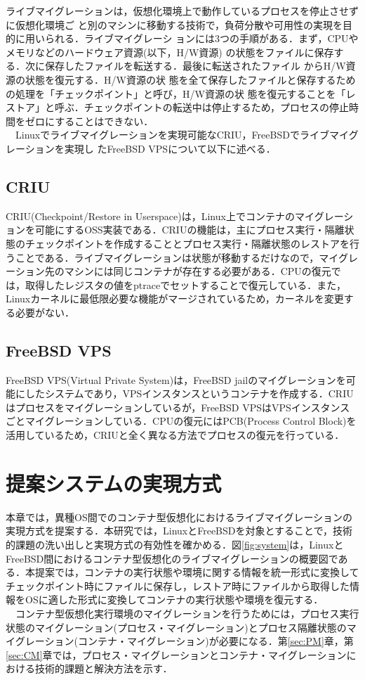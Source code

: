 \documentclass[11pt]{jarticle}
\begin{document}
ライブマイグレーションは，仮想化環境上で動作しているプロセスを停止させずに仮想化環境ご
と別のマシンに移動する技術で，負荷分散や可用性の実現を目的に用いられる．ライブマイグレーシ
ョンには3つの手順がある．まず，CPUやメモリなどのハードウェア資源(以下，H/W資源)
の状態をファイルに保存する．次に保存したファイルを転送する．最後に転送されたファイル
からH/W資源の状態を復元する．H/W資源の状
態を全て保存したファイルと保存するための処理を「チェックポイント」と呼び，H/W資源の状
態を復元することを「レストア」と呼ぶ．チェックポイントの転送中は停止するため，プロセスの停止時間をゼロにすることはできない．\\
　Linuxでライブマイグレーションを実現可能なCRIU，FreeBSDでライブマイグレーションを実現し
たFreeBSD VPSについて以下に述べる．

\subsection{CRIU}
\label{sec:CRIU}
CRIU(Checkpoint/Restore in Userspace)は，Linux上でコンテナのマイグレーションを可能にするOSS実装である．CRIUの機能は，主にプロセス実行・隔離状態のチェックポイントを作成することとプロセス実行・隔離状態のレストアを行うことである．ライブマイグレーションは状態が移動するだけなので，マイグレーション先のマシンには同じコンテナが存在する必要がある．CPUの復元では，取得したレジスタの値をptraceでセットすることで復元している．また，Linuxカーネルに最低限必要な機能がマージされているため，カーネルを変更する必要がない．

\subsection{FreeBSD VPS}
\label{sec:FreeBSD VPS}
FreeBSD VPS(Virtual Private System)は，FreeBSD jailのマイグレーションを可能にしたシステムであり，VPSインスタンスというコンテナを作成する．CRIUはプロセスをマイグレーションしているが，FreeBSD VPSはVPSインスタンスごとマイグレーションしている．CPUの復元にはPCB(Process Control Block)を活用しているため，CRIUと全く異なる方法でプロセスの復元を行っている．

\section{提案システムの実現方式}
\label{sec:suggest}
本章では，異種OS間でのコンテナ型仮想化におけるライブマイグレーションの実現方式を提案する．本研究では，LinuxとFreeBSDを対象とすることで，技術的課題の洗い出しと実現方式の有効性を確かめる．図\ref{fig:system}は，LinuxとFreeBSD間におけるコンテナ型仮想化のライブマイグレーションの概要図である．本提案では，コンテナの実行状態や環境に関する情報を統一形式に変換してチェックポイント時にファイルに保存し，レストア時にファイルから取得した情報をOSに適した形式に変換してコンテナの実行状態や環境を復元する．\\
　コンテナ型仮想化実行環境のマイグレーションを行うためには，プロセス実行状態のマイグレーション(プロセス・マイグレーション)とプロセス隔離状態のマイグレーション(コンテナ・マイグレーション)が必要になる．第\ref{sec:PM}章，第\ref{sec:CM}章では，プロセス・マイグレーションとコンテナ・マイグレーションにおける技術的課題と解決方法を示す．
\end{document}
